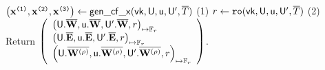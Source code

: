 


\def\hp{\hspace*{0.1in}}
\begin{small}
\begin{algorithm}[bt]
$ \left({{\mathbf {x}}}^{\texttt{(1)}},{{\mathbf {x}}}^{\texttt{(2)}},{{\mathbf {x}}}^{\texttt{(3)}}\right) 
	\leftarrow \mathsf{gen\_cf\_x}(\mathsf{vk}, \mathsf{U}, \mathsf{u}, \mathsf{U}', \overline{T})$ 
\newline
(1) $r \leftarrow \texttt{ro}(\mathsf{vk}, \mathsf{U}, \mathsf{u}, \mathsf{U}', \overline{T})$ \newline
(2) Return $\left(
	\begin{array}{l}
		{\left(
		\mathsf{U}.\overline{{{\mathbf {W}}}},
		\mathsf{u}.\overline{{{\mathbf {W}}}},
		\mathsf{U}'.\overline{{{\mathbf {W}}}},
		r\right)}_{\mapsto \mathbb{F}_r} \\
		{\left(
			\mathsf{U}.\overline{{{\mathbf {E}}}},
			\mathsf{u}.\overline{{{\mathbf {E}}}},
			\mathsf{U}'.\overline{{{\mathbf {E}}}},
			r\right)}_{\mapsto \mathbb{F}_r} \\
		{\left(
		\mathsf{U}.\overline{{{\mathbf {W^{(\rho)}}}}},
		\mathsf{u}.\overline{{{\mathbf {W^{(\rho)}}}}},
		\mathsf{U}'.\overline{{{\mathbf {W^{(\rho)}}}}},
		r\right)}_{\mapsto \mathbb{F}_r}
	\end{array}
	\right)$.



\end{algorithm}
\end{small}
